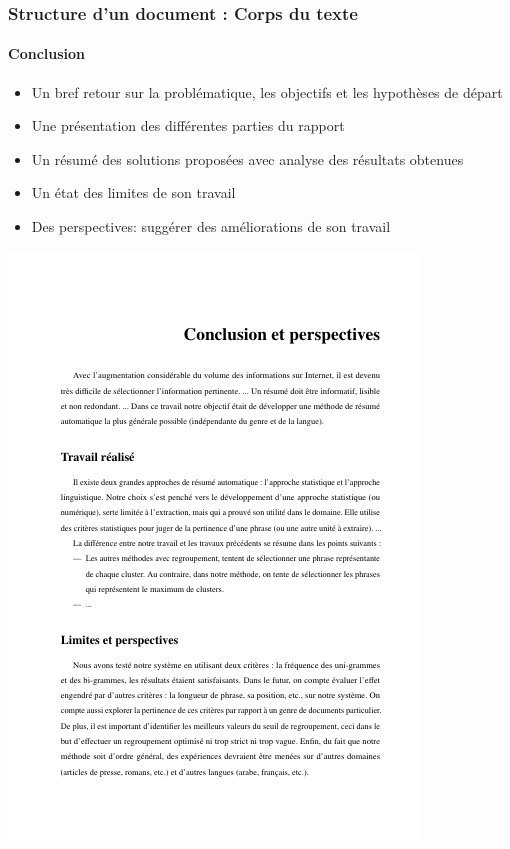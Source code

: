 \documentclass[xcolor=table]{beamer}
\begin{document}
\begin{frame}
\frametitle{Structure d'un document : Corps du texte}
\framesubtitle{Conclusion}

\begin{minipage}{0.52\textwidth}
	\begin{itemize}
		\item Un bref retour sur la problématique, les objectifs et les hypothèses de départ
		\item Une présentation des différentes parties du rapport
		\item Un résumé des solutions proposées avec analyse des résultats obtenues
		\item Un état des limites de son travail 
		\item Des perspectives: suggérer des améliorations de son travail
	\end{itemize}
\end{minipage}
\begin{minipage}{0.42\textwidth}
	\includegraphics[width=\textwidth]{..//img/Bweb03-redaction/conclusion.png}
\end{minipage}

\end{frame}
\end{document}
